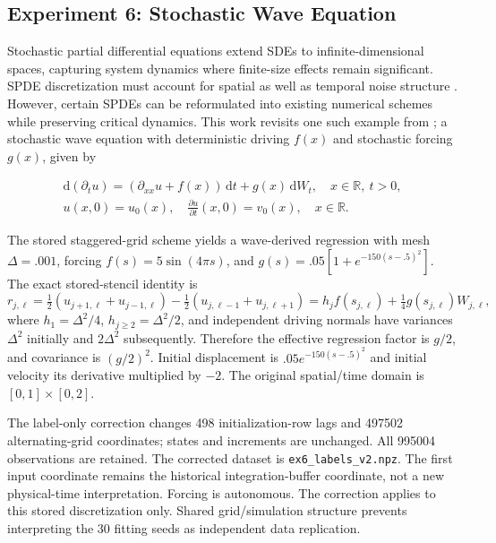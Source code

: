 \documentclass{article}
\begin{document}
\subsection{Experiment 6: Stochastic Wave Equation}

Stochastic partial differential equations extend SDEs to infinite-dimensional spaces, capturing system dynamics where finite-size effects remain significant. SPDE discretization must account for spatial as well as temporal noise structure \cite{walsh2006numerical}. However, certain SPDEs can be reformulated into existing numerical schemes while preserving critical dynamics. This work revisits one such example from \cite{Dietrich2023}; a stochastic wave equation with deterministic driving $f(x)$ and stochastic forcing $g(x)$, given by

\begin{equation}
\begin{gathered}
    \mathrm{d}(\partial_t u) = (\partial_{xx}u+f(x))\,\mathrm{d}t+g(x)\,\mathrm{d}W_t, \quad x \in \mathbb{R},\ t > 0, \\
    u(x, 0) = u_{0}(x), \quad \frac{\partial u}{\partial t}(x, 0) = v_{0}(x), \quad x \in \mathbb{R}.
\end{gathered}
\label{eq:wave_eq}
\end{equation}


The stored staggered-grid scheme yields a wave-derived regression with mesh $\Delta=.001$, forcing $f(s)=5\sin(4\pi s)$, and $g(s)=.05[1+e^{-150(s-.5)^2}]$. The exact stored-stencil identity is
\begin{equation}\label{eq:wave_scheme}
 r_{j,\ell}=\tfrac12(u_{j+1,\ell}+u_{j-1,\ell})-\tfrac12(u_{j,\ell-1}+u_{j,\ell+1})
 =h_j f(s_{j,\ell})+\tfrac14g(s_{j,\ell})W_{j,\ell},
\end{equation}
where $h_1=\Delta^2/4$, $h_{j\ge2}=\Delta^2/2$, and independent driving normals have variances $\Delta^2$ initially and $2\Delta^2$ subsequently. Therefore the effective regression factor is $g/2$, and covariance is $(g/2)^2$. Initial displacement is $.05e^{-150(s-.5)^2}$ and initial velocity its derivative multiplied by $-2$. The original spatial/time domain is $[0,1]\times[0,2]$.

The label-only correction changes 498 initialization-row lags and 497502 alternating-grid coordinates; states and increments are unchanged. All 995004 observations are retained. The corrected dataset is \texttt{ex6\_labels\_v2.npz}.
The first input coordinate remains the historical integration-buffer coordinate, not a new physical-time interpretation. Forcing is autonomous. The correction applies to this stored discretization only. Shared grid/simulation structure prevents interpreting the 30 fitting seeds as independent data replication.
\end{document}
